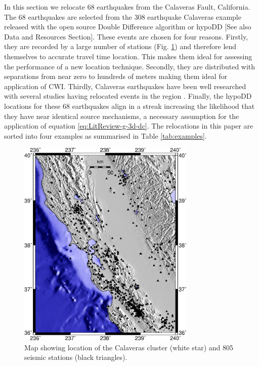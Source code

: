 \documentclass[extra, onecolumn, doublespacing]{gji}
\begin{document}
In this section we relocate 68 earthquakes from the Calaveras Fault,
California. The 68 earthquakes are selected from the 308 earthquake
Calaveras example released with the open source Double Difference
algorithm or hypoDD \citep{dr_Waldhauser00a, dr_Waldhauser01a} [See
also Data and Resources Section]. These events are chosen for four
reasons. Firstly, they are recorded by a large number of stations
(Fig. \ref{fig:-eqopti-California-Calaveras}) and therefore lend
themselves to accurate travel time location. This makes them ideal
for assessing the performance of a new location technique. Secondly,
they are distributed with separations from near zero to hundreds of
meters making them ideal for application of CWI. Thirdly, Calaveras
earthquakes have been well researched with several studies having
relocated events in the region \citep{dr_Waldhauser01a,
dr_Schaff02a, dr_Waldhauser08a}. Finally, the hypoDD locations for
these 68 earthquakes align in a streak increasing the likelihood
that they have near identical source mechanisms, a necessary
assumption for the application of equation
\ref{eq:LitReview-g-3d-dc}. The relocations in this paper are sorted
into four examples as summarised in Table \ref{tab:examples}.

\begin{figure}
\noindent\includegraphics[width =
20pc]{diags/CalaverasMap/gmt_california/CaliforniaCalaverasMap1.eps}
\caption{Map showing location of the Calaveras
cluster (white star) and 805 seismic stations (black triangles).}
\label{fig:-eqopti-California-Calaveras}
\end{figure}
\end{document}
